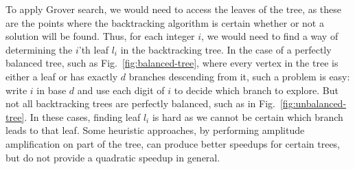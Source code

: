 To apply Grover search, we would need to access the leaves of the tree, as these are the points where the backtracking algorithm is certain whether or not a solution will be found. Thus, for each integer $i$, we would need to find a way of determining the $i$'th leaf $l_i$ in the backtracking tree. In the case of a perfectly balanced tree, such as Fig.\ \ref{fig:balanced-tree}, where every vertex in the tree is either a leaf or has exactly $d$ branches descending from it, such a problem is easy: write $i$ in base $d$ and use each digit of $i$ to decide which branch to explore. But not all backtracking trees are perfectly balanced, such as in Fig.\ \ref{fig:unbalanced-tree}. In these cases, finding leaf $l_i$ is hard as we cannot be certain which branch leads to that leaf. Some heuristic approaches, by performing amplitude amplification on part of the tree, can produce better speedups for certain trees, but do not provide a quadratic speedup in general.


